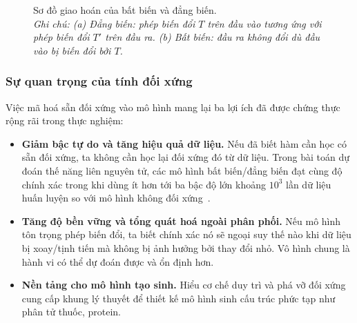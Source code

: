 \begin{figure}[H]
\centering
{}
\caption[Sơ đồ giao hoán của bất biến và đẳng biến]{Sơ đồ giao hoán của bất biến và đẳng biến.\protect\\[2pt]
\textit{Ghi chú: (a) Đẳng biến: phép biến đổi $T$ trên đầu vào tương ứng với phép biến đổi $T'$ trên đầu ra. (b) Bất biến: đầu ra không đổi dù đầu vào bị biến đổi bởi $T$.}}
\label{fig:commute}
\end{figure}
 
\subsubsection{Sự quan trọng của tính đối xứng}
Việc mã hoá sẵn đối xứng vào mô hình mang lại ba lợi ích đã được chứng thực
rộng rãi trong thực nghiệm:
\begin{itemize}[leftmargin=1.4em, itemsep=2pt, topsep=2pt]
  \item \textbf{Giảm bậc tự do và tăng hiệu quả dữ liệu.} Nếu đã biết hàm cần
  học có sẵn đối xứng, ta không cần học lại đối xứng đó từ dữ liệu. Trong bài toán dự đoán thế năng liên nguyên tử, các mô hình bất biến/đẳng biến đạt cùng độ chính xác trong khi dùng ít hơn tới ba bậc độ lớn khoảng $10^{3}$ lần dữ liệu huấn luyện so với mô hình không đối xứng~\cite{batzner2022nequip}.
  \item \textbf{Tăng độ bền vững và tổng quát hoá ngoài phân phối.} Nếu
  mô hình tôn trọng phép biến đổi, ta biết chính xác nó sẽ ngoại suy thế nào khi dữ liệu bị xoay/tịnh tiến mà không bị ảnh hưởng bởi thay đổi nhỏ. Vô hình chung là hành vi có thể dự đoán được và ổn định hơn.
  \item \textbf{Nền tảng cho mô hình tạo sinh.} Hiểu cơ chế duy trì và phá vỡ
  đối xứng cung cấp khung lý thuyết để thiết kế mô hình sinh cấu trúc phức tạp như phân tử thuốc, protein.
\end{itemize}
 
